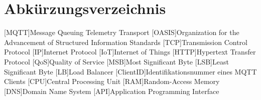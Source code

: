 

\section*{Abkürzungsverzeichnis}
\begin{acronym}[xxxxxxxxxx] %
    [MQTT]{Message Queuing Telemetry Transport}
    [OASIS]{Organization for the Advancement of Structured Information Standards}
    [TCP]{Transmission Control Protocol}
    [IP]{Internet Protocol}
    [IoT]{Internet of Things}
    [HTTP]{Hypertext Transfer Protocol}
    [QoS]{Quality of Service}
    [MSB]{Most Significant Byte}
    [LSB]{Least Significant Byte}
    [LB]{Load Balancer}
    [ClientID]{Identifikationsnummer eines MQTT Clients}
    [CPU]{Central Processing Unit}
    [RAM]{Random-Access Memory}
    [DNS]{Domain Name System}
    [API]{Application Programming Interface}
\end{acronym}

